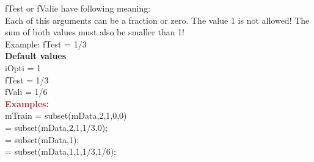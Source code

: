 \noindent fTest or fValie have following meaning:\\
Each of this arguments can be a fraction or zero. The value 1 is not allowed! The sum of both values
must also be smaller than 1!\\
Example: fTest = 1/3\\

\noindent \textbf{Default values}\\
\noindent iOpti		= 1\\
\noindent fTest		= 1/3\\
\noindent fVali		= 1/6\\

\noindent \textbf{\textcolor{brown}{Examples:}}\\

\noindent mTrain = subset(mData,2,1,0,0)\\
 = subset(mData,2,1,1/3,0);\\
 = subset(mData,1);\\
 = subset(mData,1,1,1/3,1/6);\\